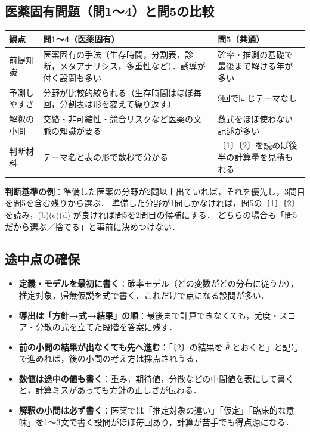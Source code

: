 \subsection{医薬固有問題（問1〜4）と問5の比較}
\begin{center}\small
\begin{tabular}{@{}L{32mm}L{53mm}L{53mm}@{}}
\toprule
観点 & 問1〜4（医薬固有） & 問5（共通）\\
\midrule
前提知識 & 医薬固有の手法（生存時間，分割表，診断，メタアナリシス，多重性など）．誘導が付く設問も多い & 確率・推測の基礎で最後まで解ける年が多い\\
予測しやすさ & 分野が比較的絞られる（生存時間はほぼ毎回，分割表は形を変えて繰り返す） & 9回で同じテーマなし\\
解釈の小問 & 交絡・非可縮性・競合リスクなど医薬の文脈の知識が要る & 数式をほぼ使わない記述が多い\\
判断材料 & テーマ名と表の形で数秒で分かる & 〔1〕〔2〕を読めば後半の計算量を見積もれる\\
\bottomrule
\end{tabular}
\end{center}
\textbf{判断基準の例}：準備した医薬の分野が2問以上出ていれば，それを優先し，3問目を問5を含む残りから選ぶ．
準備した分野が1問しかなければ，問5の〔1〕〔2〕を読み，(b)(c)(d) が良ければ問5を2問目の候補にする．
どちらの場合も「問5だから選ぶ／捨てる」と事前に決めつけない．

\subsection{途中点の確保}
\begin{itemize}
\item \textbf{定義・モデルを最初に書く}：確率モデル（どの変数がどの分布に従うか），推定対象，帰無仮説を式で書く．これだけで点になる設問が多い．
\item \textbf{導出は「方針→式→結果」の順}：最後まで計算できなくても，尤度・スコア・分散の式を立てた段階を答案に残す．
\item \textbf{前の小問の結果が出なくても先へ進む}：「〔2〕の結果を $\hat\theta$ とおくと」と記号で進めれば，後の小問の考え方は採点されうる．
\item \textbf{数値は途中の値も書く}：重み，期待値，分散などの中間値を表にして書くと，計算ミスがあっても方針の正しさが伝わる．
\item \textbf{解釈の小問は必ず書く}：医薬では「推定対象の違い」「仮定」「臨床的な意味」を1〜3文で書く設問がほぼ毎回あり，計算が苦手でも得点源になる．
\end{itemize}

